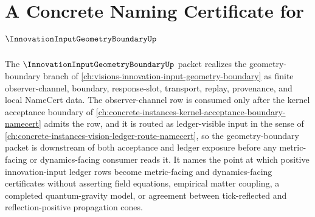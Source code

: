 \chapter{A Concrete Naming Certificate for $\InnovationInputGeometryBoundaryUp$}
\label{ch:concrete-instances-innovation-input-geometry-boundary-namecert}

The $\InnovationInputGeometryBoundaryUp$ packet realizes the geometry-boundary branch of \autoref{ch:visions-innovation-input-geometry-boundary} as finite observer-channel, boundary, response-slot, transport, replay, provenance, and local NameCert data. The observer-channel row is consumed only after the kernel acceptance boundary of \autoref{ch:concrete-instances-kernel-acceptance-boundary-namecert} admits the row, and it is routed as ledger-visible input in the sense of \autoref{ch:concrete-instances-vision-ledger-route-namecert}, so the geometry-boundary packet is downstream of both acceptance and ledger exposure before any metric-facing or dynamics-facing consumer reads it. It names the point at which positive innovation-input ledger rows become metric-facing and dynamics-facing certificates without asserting field equations, empirical matter coupling, a completed quantum-gravity model, or agreement between tick-reflected and reflection-positive propagation cones.

